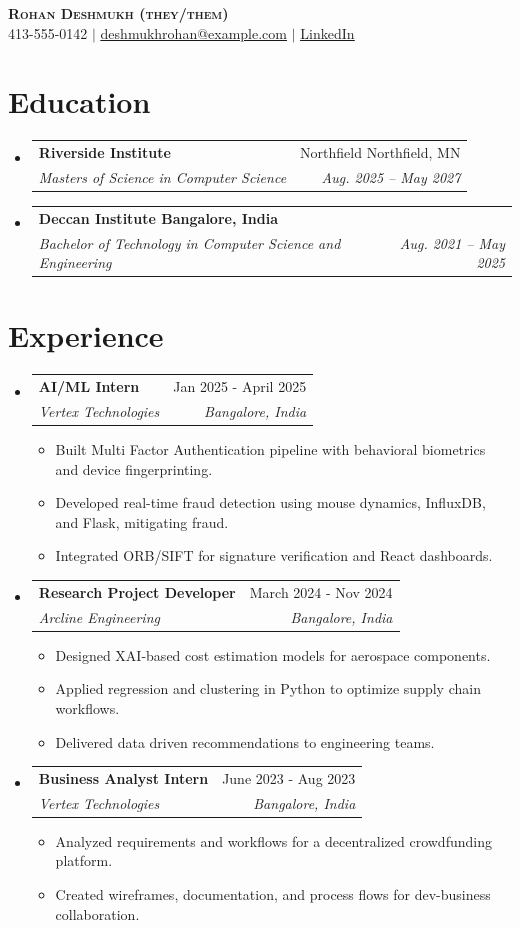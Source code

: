 \documentclass[letterpaper,11pt]{article}
\makeatletter
\newcommand{\resumeItem}[1]{
  \item\small{
    {#1 \vspace{-2pt}}
  }
}
\newcommand{\resumeSubheading}[4]{
  \vspace{-2pt}\item
    \begin{tabular*}{0.97\textwidth}[t]{l@{\extracolsep{\fill}}r}
      \textbf{#1} & #2 \\
      \textit{\small#3} & \textit{\small #4} \\
    \end{tabular*}\vspace{-7pt}
}
\newcommand{\resumeSubHeadingListStart}{\begin{itemize}[leftmargin=0.15in, label={}]}
\newcommand{\resumeSubHeadingListEnd}{\end{itemize}}
\newcommand{\resumeItemListStart}{\begin{itemize}}
\newcommand{\resumeItemListEnd}{\end{itemize}\vspace{-5pt}}
\makeatother
\begin{document}

\begin{center}
    \textbf{\Huge \scshape Rohan Deshmukh (they/them)} \\ \vspace{1pt}
    \small 413-555-0142 $|$ \href{mailto:deshmukhrohan@example.com}{\underline{deshmukhrohan@example.com}} $|$ \href{https://www.linkedin.com/in/rohandeshmukh}{\underline{LinkedIn}}
\end{center}

\section{Education}
  \resumeSubHeadingListStart
    \resumeSubheading
      {Riverside Institute}{Northfield Northfield, MN}
      {Masters of Science in Computer Science}{Aug. 2025 – May 2027}
    \resumeSubheading
      {Deccan Institute Bangalore, India}{}
      {Bachelor of Technology in Computer Science and Engineering}{Aug. 2021 – May 2025}
  \resumeSubHeadingListEnd

\section{Experience}
  \resumeSubHeadingListStart
    \resumeSubheading
      {AI/ML Intern}{Jan 2025 - April 2025}
      {Vertex Technologies}{Bangalore, India}
      \resumeItemListStart
        \resumeItem{Built Multi Factor Authentication pipeline with behavioral biometrics and device fingerprinting.}
        \resumeItem{Developed real-time fraud detection using mouse dynamics, InfluxDB, and Flask, mitigating fraud.}
        \resumeItem{Integrated ORB/SIFT for signature verification and React dashboards.}
      \resumeItemListEnd
    \resumeSubheading
      {Research Project Developer}{March 2024 - Nov 2024}
      {Arcline Engineering}{Bangalore, India}
      \resumeItemListStart
        \resumeItem{Designed XAI-based cost estimation models for aerospace components.}
        \resumeItem{Applied regression and clustering in Python to optimize supply chain workflows.}
        \resumeItem{Delivered data driven recommendations to engineering teams.}
      \resumeItemListEnd
    \resumeSubheading
      {Business Analyst Intern}{June 2023 - Aug 2023}
      {Vertex Technologies}{Bangalore, India}
      \resumeItemListStart
        \resumeItem{Analyzed requirements and workflows for a decentralized crowdfunding platform.}
        \resumeItem{Created wireframes, documentation, and process flows for dev-business collaboration.}
      \resumeItemListEnd
  \resumeSubHeadingListEnd
\end{document}
